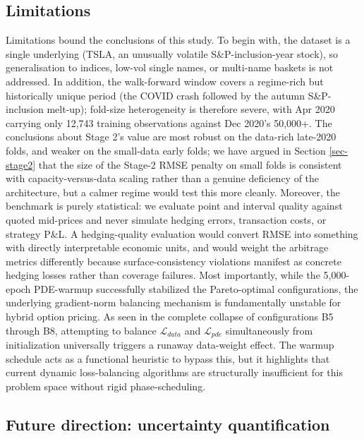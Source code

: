 \documentclass[
  11pt,
]{article}
\begin{document}
\subsection{Limitations}\label{limitations}

Limitations bound the conclusions of this study. To begin with, the
dataset is a single underlying (TSLA, an unusually volatile
S\&P-inclusion-year stock), so generalisation to indices, low-vol single
names, or multi-name baskets is not addressed. In addition, the
walk-forward window covers a regime-rich but historically unique period
(the COVID crash followed by the autumn S\&P-inclusion melt-up);
fold-size heterogeneity is therefore severe, with Apr 2020 carrying only
12,743 training observations against Dec 2020's 50,000+. The conclusions
about Stage 2's value are most robust on the data-rich late-2020 folds,
and weaker on the small-data early folds; we have argued in Section
\ref{sec-stage2} that the size of the Stage-2 RMSE penalty on small
folds is consistent with capacity-versus-data scaling rather than a
genuine deficiency of the architecture, but a calmer regime would test
this more cleanly. Moreover, the benchmark is purely statistical: we
evaluate point and interval quality against quoted mid-prices and never
simulate hedging errors, transaction costs, or strategy P\&L. A
hedging-quality evaluation would convert RMSE into something with
directly interpretable economic units, and would weight the arbitrage
metrics differently because surface-consistency violations manifest as
concrete hedging losses rather than coverage failures. Most importantly,
while the 5,000-epoch PDE-warmup successfully stabilized the
Pareto-optimal configurations, the underlying gradient-norm balancing
mechanism is fundamentally unstable for hybrid option pricing. As seen
in the complete collapse of configurations B5 through B8, attempting to
balance \(\mathcal{L}_{data}\) and \(\mathcal{L}_{pde}\) simultaneously
from initialization universally triggers a runaway data-weight effect.
The warmup schedule acts as a functional heuristic to bypass this, but
it highlights that current dynamic loss-balancing algorithms are
structurally insufficient for this problem space without rigid
phase-scheduling.

\subsection{Future direction: uncertainty
quantification}\label{sec-uq-future}
\end{document}
